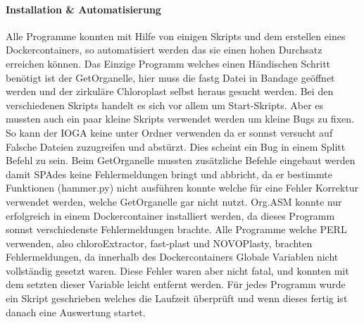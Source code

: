 \documentclass{scrartcl}
\begin{document}
\paragraph{Installation \& Automatisierung}
\label{sec-2-1-2-1}
Alle Programme konnten mit Hilfe von einigen Skripts und dem erstellen eines Dockercontainers, so 
automatisiert werden das sie einen hohen Durchsatz erreichen können. Das Einzige Programm welches
einen Händischen Schritt benötigt ist der GetOrganelle, hier muss die fastg Datei in Bandage
geöffnet werden und der zirkuläre Chloroplast selbst heraus gesucht werden.
Bei den verschiedenen Skripts handelt es sich vor allem um Start-Skripts. Aber es mussten auch ein paar 
kleine Skripts verwendet werden um kleine Bugs zu fixen. So kann der IOGA keine unter Ordner verwenden da er sonnst
versucht auf Falsche Dateien zuzugreifen und abstürzt. Dies scheint ein Bug in einem Splitt Befehl zu sein. Beim GetOrganelle mussten
zusätzliche Befehle eingebaut werden damit SPAdes keine Fehlermeldungen bringt und abbricht, da er bestimmte Funktionen (hammer.py) nicht ausführen konnte
welche für eine Fehler Korrektur verwendet werden, welche GetOrganelle gar nicht nutzt. Org.ASM konnte nur erfolgreich in einem Dockercontainer
installiert werden, da dieses Programm sonnst verschiedenste Fehlermeldungen brachte. Alle Programme welche PERL verwenden, also
chloroExtractor, fast-plast und NOVOPlasty, brachten Fehlermeldungen, da innerhalb des Dockercontainers Globale Variablen nicht vollständig gesetzt waren. 
Diese Fehler waren aber nicht fatal, und konnten mit dem setzten dieser Variable leicht entfernt werden. 
Für jedes Programm wurde ein Skript geschrieben welches die Laufzeit überprüft und wenn dieses fertig ist danach eine Auswertung startet.
\end{document}
